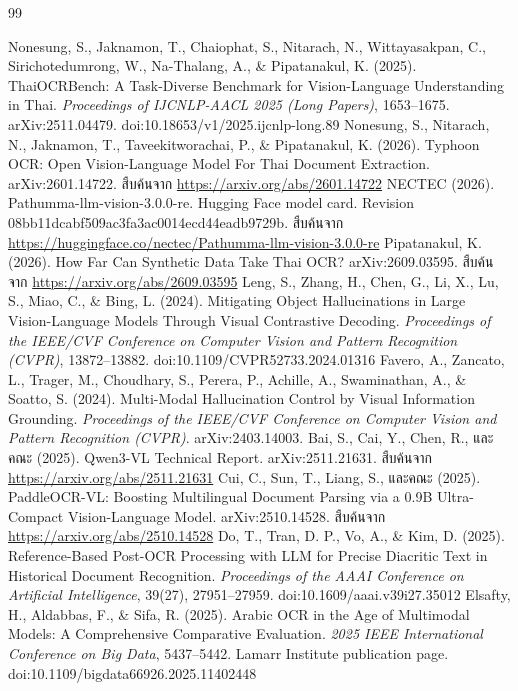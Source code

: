 \begin{thebibliography}{99}
\raggedright\small
{} Nonesung, S., Jaknamon, T., Chaiophat, S., Nitarach, N., Wittayasakpan, C., Sirichotedumrong, W., Na-Thalang, A., \& Pipatanakul, K. (2025). ThaiOCRBench: A Task-Diverse Benchmark for Vision-Language Understanding in Thai. \textit{Proceedings of IJCNLP-AACL 2025 (Long Papers)}, 1653–1675. arXiv:2511.04479. doi:10.18653/v1/2025.ijcnlp-long.89
 Nonesung, S., Nitarach, N., Jaknamon, T., Taveekitworachai, P., \& Pipatanakul, K. (2026). Typhoon OCR: Open Vision-Language Model For Thai Document Extraction. arXiv:2601.14722. สืบค้นจาก \url{https://arxiv.org/abs/2601.14722}
 NECTEC (2026). Pathumma-llm-vision-3.0.0-re. Hugging Face model card. Revision 08bb11dcabf509ac3fa3ac0014ecd44eadb9729b. สืบค้นจาก \url{https://huggingface.co/nectec/Pathumma-llm-vision-3.0.0-re}
 Pipatanakul, K. (2026). How Far Can Synthetic Data Take Thai OCR? arXiv:2609.03595. สืบค้นจาก \url{https://arxiv.org/abs/2609.03595}
 Leng, S., Zhang, H., Chen, G., Li, X., Lu, S., Miao, C., \& Bing, L. (2024). Mitigating Object Hallucinations in Large Vision-Language Models Through Visual Contrastive Decoding. \textit{Proceedings of the IEEE/CVF Conference on Computer Vision and Pattern Recognition (CVPR)}, 13872–13882. doi:10.1109/CVPR52733.2024.01316
 Favero, A., Zancato, L., Trager, M., Choudhary, S., Perera, P., Achille, A., Swaminathan, A., \& Soatto, S. (2024). Multi-Modal Hallucination Control by Visual Information Grounding. \textit{Proceedings of the IEEE/CVF Conference on Computer Vision and Pattern Recognition (CVPR)}. arXiv:2403.14003.
 Bai, S., Cai, Y., Chen, R., และคณะ (2025). Qwen3-VL Technical Report. arXiv:2511.21631. สืบค้นจาก \url{https://arxiv.org/abs/2511.21631}
 Cui, C., Sun, T., Liang, S., และคณะ (2025). PaddleOCR-VL: Boosting Multilingual Document Parsing via a 0.9B Ultra-Compact Vision-Language Model. arXiv:2510.14528. สืบค้นจาก \url{https://arxiv.org/abs/2510.14528}
 Do, T., Tran, D. P., Vo, A., \& Kim, D. (2025). Reference-Based Post-OCR Processing with LLM for Precise Diacritic Text in Historical Document Recognition. \textit{Proceedings of the AAAI Conference on Artificial Intelligence}, 39(27), 27951–27959. doi:10.1609/aaai.v39i27.35012
 Elsafty, H., Aldabbas, F., \& Sifa, R. (2025). Arabic OCR in the Age of Multimodal Models: A Comprehensive Comparative Evaluation. \textit{2025 IEEE International Conference on Big Data}, 5437–5442. Lamarr Institute publication page. doi:10.1109/bigdata66926.2025.11402448

\end{thebibliography}
